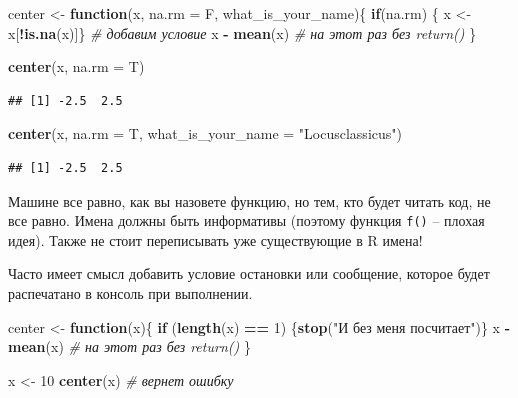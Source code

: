 \documentclass[
]{book}
\newenvironment{Shaded}{\begin{snugshade}}{\end{snugshade}}
\newcommand{\AttributeTok}[1]{\textcolor[rgb]{0.13,0.29,0.53}{#1}}
\newcommand{\CommentTok}[1]{\textcolor[rgb]{0.56,0.35,0.01}{\textit{#1}}}
\newcommand{\ControlFlowTok}[1]{\textcolor[rgb]{0.13,0.29,0.53}{\textbf{#1}}}
\newcommand{\DecValTok}[1]{\textcolor[rgb]{0.00,0.00,0.81}{#1}}
\newcommand{\FunctionTok}[1]{\textcolor[rgb]{0.13,0.29,0.53}{\textbf{#1}}}
\newcommand{\NormalTok}[1]{#1}
\newcommand{\OtherTok}[1]{\textcolor[rgb]{0.56,0.35,0.01}{#1}}
\newcommand{\SpecialCharTok}[1]{\textcolor[rgb]{0.81,0.36,0.00}{\textbf{#1}}}
\newcommand{\StringTok}[1]{\textcolor[rgb]{0.31,0.60,0.02}{#1}}
\theoremstyle{definition}
\theoremstyle{definition}
\theoremstyle{definition}
\theoremstyle{definition}
\theoremstyle{remark}
\begin{document}
\begin{Shaded}
\begin{Highlighting}[]
\NormalTok{center }\OtherTok{\textless{}{-}} \ControlFlowTok{function}\NormalTok{(x, }\AttributeTok{na.rm =}\NormalTok{ F, what\_is\_your\_name)\{}
  \ControlFlowTok{if}\NormalTok{(na.rm) \{ x }\OtherTok{\textless{}{-}}\NormalTok{ x[}\SpecialCharTok{!}\FunctionTok{is.na}\NormalTok{(x)]\} }\CommentTok{\# добавим условие}
\NormalTok{  x }\SpecialCharTok{{-}} \FunctionTok{mean}\NormalTok{(x) }\CommentTok{\# на этот раз без return()}
\NormalTok{\}}

\FunctionTok{center}\NormalTok{(x, }\AttributeTok{na.rm =}\NormalTok{ T)}
\end{Highlighting}
\end{Shaded}

\begin{verbatim}
## [1] -2.5  2.5
\end{verbatim}

\begin{Shaded}
\begin{Highlighting}[]
\FunctionTok{center}\NormalTok{(x, }\AttributeTok{na.rm =}\NormalTok{ T, }\AttributeTok{what\_is\_your\_name =} \StringTok{"Locusclassicus"}\NormalTok{)}
\end{Highlighting}
\end{Shaded}

\begin{verbatim}
## [1] -2.5  2.5
\end{verbatim}

Машине все равно, как вы назовете функцию, но тем, кто будет читать код, не все равно. Имена должны быть информативы (поэтому функция \texttt{f()} -- плохая идея). Также не стоит переписывать уже существующие в R имена!

Часто имеет смысл добавить условие остановки или сообщение, которое будет распечатано в консоль при выполнении.

\begin{Shaded}
\begin{Highlighting}[]
\NormalTok{center }\OtherTok{\textless{}{-}} \ControlFlowTok{function}\NormalTok{(x)\{}
  \ControlFlowTok{if}\NormalTok{ (}\FunctionTok{length}\NormalTok{(x) }\SpecialCharTok{==} \DecValTok{1}\NormalTok{) \{}\FunctionTok{stop}\NormalTok{(}\StringTok{"И без меня посчитает"}\NormalTok{)\}}
\NormalTok{  x }\SpecialCharTok{{-}} \FunctionTok{mean}\NormalTok{(x) }\CommentTok{\# на этот раз без return()}
\NormalTok{\}}

\NormalTok{x }\OtherTok{\textless{}{-}} \DecValTok{10}
\FunctionTok{center}\NormalTok{(x) }\CommentTok{\# вернет ошибку}
\end{Highlighting}
\end{Shaded}
\end{document}
